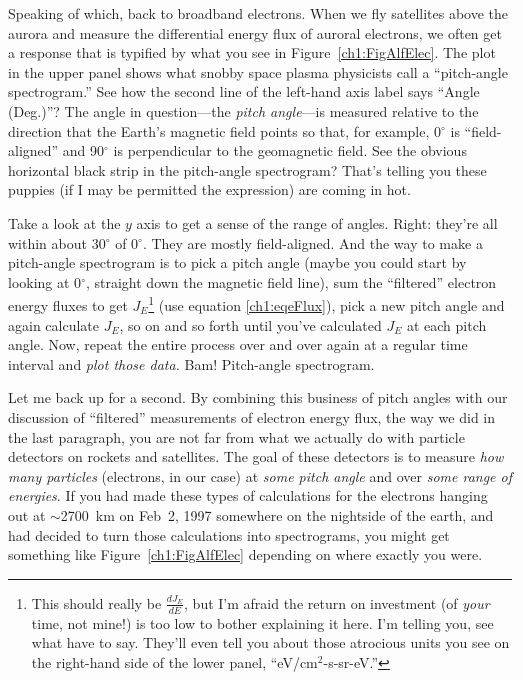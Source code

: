 
Speaking of which, back to broadband electrons. When we fly satellites
above the aurora and measure the differential energy flux of auroral
electrons, we often get a response that is typified by what you see in
Figure~\ref{ch1:FigAlfElec}. The plot in the upper panel shows what
snobby space plasma physicists call a ``pitch-angle spectrogram.''
See how the second line of the left-hand axis label says ``Angle
(Deg.)''?  The angle in question---the \emph{pitch angle}---is
measured relative to the direction that the Earth's magnetic field
points so that, for example, 0$^\circ$ is ``field-aligned'' and
90$^\circ$ is perpendicular to the geomagnetic field. See the obvious
horizontal black strip in the pitch-angle spectrogram? That's telling
you these puppies (if I may be permitted the expression) are coming in
hot.

Take a look at the $y$ axis to get a sense of the range of
angles. Right: they're all within about 30$^\circ$ of 0$^\circ$. They
are mostly field-aligned. And the way to make a pitch-angle
spectrogram is to pick a pitch angle (maybe you could start by looking
at 0$^\circ$, straight down the magnetic field line), sum the
``filtered'' electron energy fluxes to get $J_E$\footnote{This should
  really be $\frac{dJ_E}{dE}$, but I'm afraid the return on investment
  (of \emph{your} time, not mine!) is too low to bother explaining it
  here. I'm telling you, see what \citet{Bruno2013} have to
  say. They'll even tell you about those atrocious units you see on
  the right-hand side of the lower panel, ``eV/cm$^2$-s-sr-eV.''} (use
equation \ref{ch1:eqeFlux}), pick a new pitch angle and again
calculate $J_E$, so on and so forth until you've calculated $J_E$ at
each pitch angle. Now, repeat the entire process over and over again
at a regular time interval and \emph{plot those data.} Bam!
Pitch-angle spectrogram.

Let me back up for a second. By combining this business of pitch
angles with our discussion of ``filtered'' measurements of electron
energy flux, the way we did in the last paragraph, you are not far
from what we actually do with particle detectors on rockets and
satellites. The goal of these detectors is to measure \emph{how many
  particles} (electrons, in our case) at \emph{some pitch angle} and
over \emph{some range of energies}. If you had made these types of
calculations for the electrons hanging out at $\sim$2700~km on Feb~2,
1997 somewhere on the nightside of the earth, and had decided to turn
those calculations into spectrograms, you might get something like
Figure~\ref{ch1:FigAlfElec} depending on where exactly you were.

